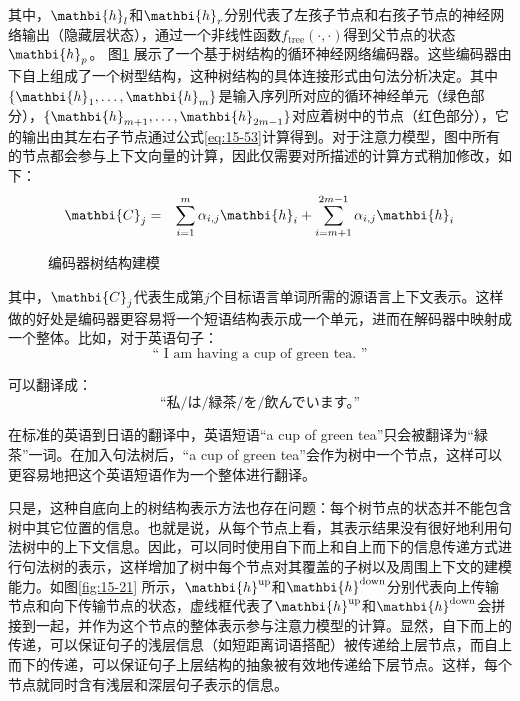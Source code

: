 \noindent 其中，$\mathbi{h}_l$和$\mathbi{h}_r$分别代表了左孩子节点和右孩子节点的神经网络输出（隐藏层状态），通过一个非线性函数$f_\textrm{tree}(\cdot,\cdot)$得到父节点的状态$\mathbi{h}_p$。 图\ref{fig:15-20} 展示了一个基于树结构的循环神经网络编码器。这些编码器由下自上组成了一个树型结构，这种树结构的具体连接形式由句法分析决定。其中$\{\mathbi{h}_1,\ldots,\mathbi{h}_m\}$是输入序列所对应的循环神经单元（绿色部分），$\{\mathbi{h}_{m+1},\ldots,\mathbi{h}_{2m-1}\}$对应着树中的节点（红色部分），它的输出由其左右子节点通过公式\eqref{eq:15-53}计算得到。对于注意力模型，图中所有的节点都会参与上下文向量的计算，因此仅需要对{\chapterten}所描述的计算方式稍加修改，如下：
\begin{eqnarray}
\mathbi{C}_j &=& \sum_{i=1}^{m}\alpha_{i,j}\mathbi{h}_i + \sum_{i=m+1}^{2m-1}\alpha_{i,j}\mathbi{h}_i
\label{eq:15-54}
\end{eqnarray}

\begin{figure}[htp]
\centering

\caption{编码器树结构建模}
\label{fig:15-20}
\end{figure}

\noindent 其中，$\mathbi{C}_j$代表生成第$j$个目标语言单词所需的源语言上下文表示。这样做的好处是编码器更容易将一个短语结构表示成一个单元，进而在解码器中映射成一个整体。比如，对于英语句子：
\begin{equation}
\textrm{“ I am having a cup of green tea. ”} \nonumber
\end{equation}

\noindent 可以翻译成：
\begin{equation}
\textrm{“私/は/緑茶/を/飲んでいます。”} \nonumber
\end{equation}

\parinterval 在标准的英语到日语的翻译中，英语短语“a cup of green tea”只会被翻译为“緑茶”一词。在加入句法树后，“a cup of green tea”会作为树中一个节点，这样可以更容易地把这个英语短语作为一个整体进行翻译。

\parinterval 只是，这种自底向上的树结构表示方法也存在问题：每个树节点的状态并不能包含树中其它位置的信息。也就是说，从每个节点上看，其表示结果没有很好地利用句法树中的上下文信息。因此，可以同时使用自下而上和自上而下的信息传递方式进行句法树的表示，这样增加了树中每个节点对其覆盖的子树以及周围上下文的建模能力。如图\ref{fig:15-21} 所示，$\mathbi{h}^\textrm{up}$和$\mathbi{h}^\textrm{down}$分别代表向上传输节点和向下传输节点的状态，虚线框代表了$\mathbi{h}^\textrm{up}$和$\mathbi{h}^\textrm{down}$会拼接到一起，并作为这个节点的整体表示参与注意力模型的计算。显然，自下而上的传递，可以保证句子的浅层信息（如短距离词语搭配）被传递给上层节点，而自上而下的传递，可以保证句子上层结构的抽象被有效地传递给下层节点。这样，每个节点就同时含有浅层和深层句子表示的信息。

